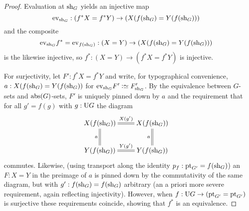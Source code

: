 \begin{proof}
  Evaluation at $\mathrm{sh}_G$  yields an injective map 
$$\mathrm{ev}_{\mathrm{sh}_G}:(f^*X=f^*Y)\to(X(f(\mathrm{sh}_G)=Y(f(\mathrm{sh}_G)))$$ and the composite 
$$\mathrm{ev}_{\mathrm{sh}_G}f^*=\mathrm{ev}_{f(\mathrm{sh}_G)}:(X=Y)\to(X(f(\mathrm{sh}_G)=Y(f(\mathrm{sh}_G)))$$
 is the likewise injective, so $f^*:(X=Y)\to(f^*X=f^*Y)$ is injective. 

For surjectivity, let $F':f^*X=f^*Y$ and write, for typographical convenience, $a:X(f(\mathrm{sh}_G)=Y(f(\mathrm{sh}_G))$ for $\mathrm{ev}_{\sh_G}F'\defequi F'_{\sh_G}$.  
By the equivalence between $G$-sets and $\mathrm{abs}(G)$-sets, $F'$ is uniquely pinned down by $a$ and the requirement that for all $g'=f(g)$ with $g:\mathrm{U} G$ the diagram 
$$\xymatrix{X(f(\sh_G))\ar@{=}[r]^{X({g'})}\ar@{=}[d]_{a}&
  X(f(\sh_G))\ar@{=}[d]_{a}\\
  Y(f(\sh_G))\ar@{=}[r]^{Y({g'})}&Y(f(\sh_G))}
$$
commutes.  Likewise, (using transport along the identity $p_f:\mathrm{pt}_{G'}=f(\mathrm{sh}_G)$) an $F:X=Y$ in the preimage of $a$ is pinned down by the commutativity of the same diagram, but with $g':f(\mathrm{sh}_G)=f(\mathrm{sh}_G)$ arbitrary (an a priori more severe requirement, again reflecting injectivity).   However, when $f:\mathrm{U} G\to(\mathrm{pt}_{G'}=\mathrm{pt}_{G'})$ is surjective these requirements coincide, showing that $f^*$ is an equivalence.





\end{proof}



